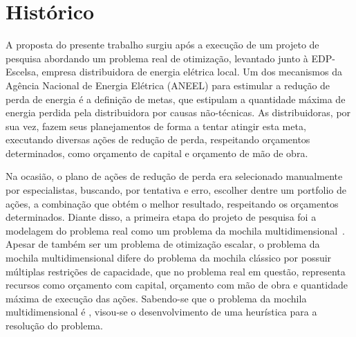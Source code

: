 \section{Histórico}


A proposta do presente trabalho surgiu após a execução de um projeto de pesquisa abordando
um problema real de otimização, levantado junto à EDP-Escelsa, empresa distribuidora de energia elétrica local.
Um dos mecanismos da Agência Nacional de Energia Elétrica (ANEEL) para estimular
a redução de perda de energia é a definição de metas,
que estipulam a quantidade máxima de energia perdida pela distribuidora por
causas não-técnicas. As distribuidoras, por sua vez, fazem seus planejamentos de forma a tentar
atingir esta meta, executando diversas ações de redução de perda,
respeitando orçamentos determinados, como orçamento de capital e orçamento de mão de obra.

Na ocasião, o plano de ações de redução de perda era selecionado manualmente por especialistas, buscando,
por tentativa e erro, escolher dentre um portfolio de ações, a combinação que obtém o melhor resultado, respeitando os orçamentos determinados.
Diante disso, a primeira etapa do projeto de pesquisa foi a modelagem do problema real
como um problema da mochila multidimensional~\cite{puchinger2010multidimensional}.
Apesar de também ser um problema de otimização escalar, o problema da mochila multidimensional
difere do problema da mochila clássico por possuir múltiplas restrições de capacidade, que no problema real em questão,
representa recursos como orçamento com capital, orçamento com mão de obra e quantidade máxima de execução das ações.
Sabendo-se que o problema da mochila multidimensional é \nphard{}, visou-se o desenvolvimento de uma heurística para a resolução do problema.

